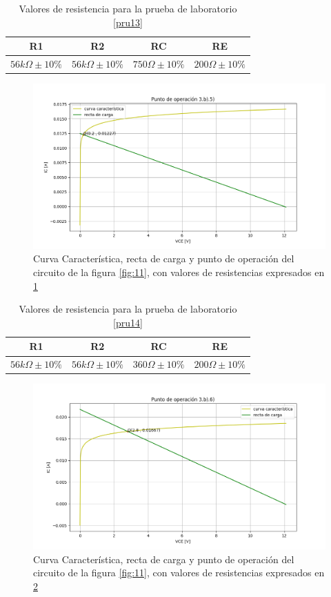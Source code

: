 \documentclass[10pt, a4paper]{article}
\begin{document}
    \newpage

    \begin{table}[h!]
        \centering
        \caption{Valores de resistencia para la prueba de laboratorio \ref{pru13}}
        \label{tab:3b5}
        \begin{tabular}{|c|c|c|c|} \hline
            R1 & R2 & RC & RE \\ \hline
            $56k\Omega \pm 10\%$ & $56k\Omega \pm 10\%$ & $750\Omega \pm 10\%$ & $200\Omega \pm 10\%$ \\ \hline
        \end{tabular}
    \end{table}

    \begin{figure}[h!]
        \centering
        \includegraphics[height=5cm\textwidth]{3b5.png}
        \caption{Curva Característica, recta de carga y punto de operación del circuito de la figura \ref{fig:11}, con valores de resistencias expresados en \ref{tab:3b5}}
        \label{fig:3b5}
    \end{figure}

    \begin{table}[h!]
        \centering
        \caption{Valores de resistencia para la prueba de laboratorio \ref{pru14}}
        \label{tab:3b6}
        \begin{tabular}{|c|c|c|c|} \hline
            R1 & R2 & RC & RE \\ \hline
            $56k\Omega \pm 10\%$ & $56k\Omega \pm 10\%$ & $360\Omega \pm 10\%$ & $200\Omega \pm 10\%$ \\ \hline
        \end{tabular}
    \end{table}

    \begin{figure}[h!]
        \centering
        \includegraphics[height=5cm\textwidth]{3b6.png}
        \caption{Curva Característica, recta de carga y punto de operación del circuito de la figura \ref{fig:11}, con valores de resistencias expresados en \ref{tab:3b6}}
        \label{fig:3b6}
    \end{figure}
\end{document}
